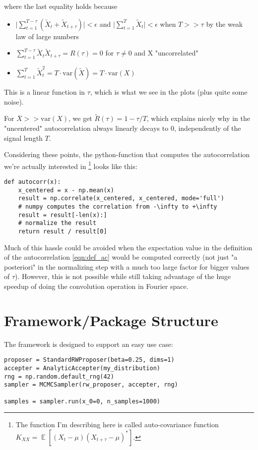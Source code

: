 \documentclass[11pt]{article}
\newcommand{\E}[1]{{\mathop{\mathbb{E}}\left[ #1 \right]}}
\begin{document}
where the last equality holds because
\begin{itemize}
\item \(\lvert\sum_{t=1}^{T-\tau} (\tilde{X}_t + \tilde{X}_{t+\tau})\rvert < \epsilon\) and \(\lvert\sum_{t=1}^T \tilde{X}_t \rvert < \epsilon\)
when \(T >> \tau\) by the weak law of large numbers
\item \(\sum_{t=1}^{T-\tau}\tilde{X}_t \tilde{X}_{t+\tau} = R(\tau) = 0\) for \(\tau \neq 0\) and X "uncorrelated"
\item \(\sum_{t=1}^T \tilde{X}_t^2 = T \cdot \text{var}(\tilde{X}) = T \cdot\text{var}(X)\)
\end{itemize}

This is a linear function in \(\tau\), which is what we see in the plots (plus quite some noise).

For \(\overline{X} >> \text{var}(X)\), we get \(\tilde{R}(\tau) = 1 - \tau / T\), which explains nicely
why in the "uncentered" autocorrelation always linearly decays to 0, independently of the signal length \(T\).

Considering these points, the python-function that computes the autocorrelation we're actually interested
in \footnote{The function I'm describing here is called auto-covariance function \(K_{XX} = \E{(X_t - \mu) (X_{t+\tau} - \mu)^*}\).} looks like this:

\begin{verbatim}
def autocorr(x):
    x_centered = x - np.mean(x)
    result = np.correlate(x_centered, x_centered, mode='full')
    # numpy computes the correlation from -\infty to +\infty
    result = result[-len(x):]
    # normalize the result
    return result / result[0]
\end{verbatim}

Much of this hassle could be avoided when the expectation value in the definition of the autocorrelation
\ref{eqn:def_ac} would be computed correctly (not just "a posteriori" in the normalizing step with
a much too large factor for bigger values of \(\tau\)). However, this is not possible while still taking
advantage of the huge speedup of doing the convolution operation in Fourier space.

\section{Framework/Package Structure}
\label{sec:org657865e}
The framework is designed to support an easy use case:
\begin{verbatim}
proposer = StandardRWProposer(beta=0.25, dims=1)
accepter = AnalyticAccepter(my_distribution)
rng = np.random.default_rng(42)
sampler = MCMCSampler(rw_proposer, accepter, rng)

samples = sampler.run(x_0=0, n_samples=1000)
\end{verbatim}
\end{document}
